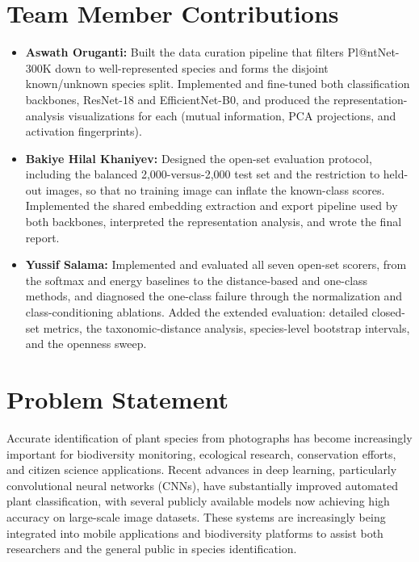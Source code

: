 \documentclass[11pt]{article}
\begin{document}
\section*{Team Member Contributions}

\begin{itemize}[leftmargin=1.2cm]
    \item \textbf{Aswath Oruganti:} Built the data curation pipeline that filters Pl@ntNet-300K down to well-represented species and forms the disjoint known/unknown species split. Implemented and fine-tuned both classification backbones, ResNet-18 and EfficientNet-B0, and produced the representation-analysis visualizations for each (mutual information, PCA projections, and activation fingerprints).
    
    \item \textbf{Bakiye Hilal Khaniyev:} Designed the open-set evaluation protocol, including the balanced 2,000-versus-2,000 test set and the restriction to held-out images, so that no training image can inflate the known-class scores. Implemented the shared embedding extraction and export pipeline used by both backbones, interpreted the representation analysis, and wrote the final report.
    
    \item \textbf{Yussif Salama:} Implemented and evaluated all seven open-set scorers, from the softmax and energy baselines to the distance-based and one-class methods, and diagnosed the one-class failure through the normalization and class-conditioning ablations. Added the extended evaluation: detailed closed-set metrics, the taxonomic-distance analysis, species-level bootstrap intervals, and the openness sweep.
\end{itemize}

\newpage

\section{Problem Statement}


Accurate identification of plant species from photographs has become increasingly important for biodiversity monitoring, ecological research, conservation efforts, and citizen science applications. Recent advances in deep learning, particularly convolutional neural networks (CNNs), have substantially improved automated plant classification, with several publicly available models now achieving high accuracy on large-scale image datasets. These systems are increasingly being integrated into mobile applications and biodiversity platforms to assist both researchers and the general public in species identification.
\end{document}
